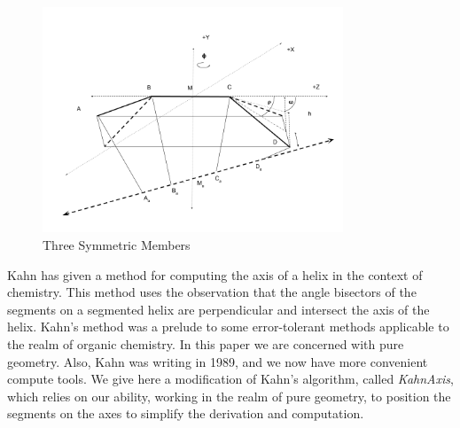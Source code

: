 \documentclass[11pt]{article}
\begin{document}
{\begin{figure}
     \centering
     \includegraphics[width=0.80\textwidth]{figures/TwoAngleDiagram.png}
     \caption{Three Symmetric Members}
  \label{fig:threemembersdiagram}
\end{figure}

Kahn\cite{kahn1989defining} has given a method for computing the axis of a helix in the context of chemistry.
This method uses the observation that the angle bisectors of the segments on a segmented helix are perpendicular
and intersect the axis of the helix. Kahn's method was a prelude to some error-tolerant methods applicable to
the realm of organic chemistry. In this paper we are concerned with pure geometry. Also, Kahn was writing in 1989,
and we now have more convenient compute tools. We give here a modification of Kahn's algorithm, called {\em KahnAxis},
which relies on our ability, working in the realm of pure geometry, to position the segments on the axes
to simplify the derivation and computation.

}
\end{document}
